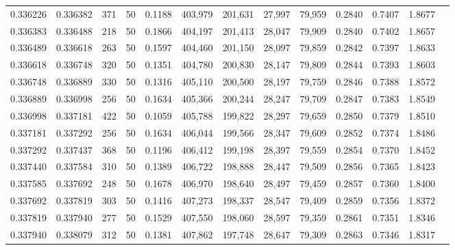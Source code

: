 \begin{tabular}{rrrrrrrrrrrrr}
0.336226 & 0.336382 &   371 &  50 &                                     0.1188 & 403,979 & 201,631 &  27,997 &  79,959 & 0.2840 & 0.7407 & 1.8677 \\
0.336383 & 0.336488 &   218 &  50 &                                     0.1866 & 404,197 & 201,413 &  28,047 &  79,909 & 0.2840 & 0.7402 & 1.8657 \\
0.336489 & 0.336618 &   263 &  50 &                                     0.1597 & 404,460 & 201,150 &  28,097 &  79,859 & 0.2842 & 0.7397 & 1.8633 \\
0.336618 & 0.336748 &   320 &  50 &                                     0.1351 & 404,780 & 200,830 &  28,147 &  79,809 & 0.2844 & 0.7393 & 1.8603 \\
0.336748 & 0.336889 &   330 &  50 &                                     0.1316 & 405,110 & 200,500 &  28,197 &  79,759 & 0.2846 & 0.7388 & 1.8572 \\
0.336889 & 0.336998 &   256 &  50 &                                     0.1634 & 405,366 & 200,244 &  28,247 &  79,709 & 0.2847 & 0.7383 & 1.8549 \\
0.336998 & 0.337181 &   422 &  50 &                                     0.1059 & 405,788 & 199,822 &  28,297 &  79,659 & 0.2850 & 0.7379 & 1.8510 \\
0.337181 & 0.337292 &   256 &  50 &                                     0.1634 & 406,044 & 199,566 &  28,347 &  79,609 & 0.2852 & 0.7374 & 1.8486 \\
0.337292 & 0.337437 &   368 &  50 &                                     0.1196 & 406,412 & 199,198 &  28,397 &  79,559 & 0.2854 & 0.7370 & 1.8452 \\
0.337440 & 0.337584 &   310 &  50 &                                     0.1389 & 406,722 & 198,888 &  28,447 &  79,509 & 0.2856 & 0.7365 & 1.8423 \\
0.337585 & 0.337692 &   248 &  50 &                                     0.1678 & 406,970 & 198,640 &  28,497 &  79,459 & 0.2857 & 0.7360 & 1.8400 \\
0.337692 & 0.337819 &   303 &  50 &                                     0.1416 & 407,273 & 198,337 &  28,547 &  79,409 & 0.2859 & 0.7356 & 1.8372 \\
0.337819 & 0.337940 &   277 &  50 &                                     0.1529 & 407,550 & 198,060 &  28,597 &  79,359 & 0.2861 & 0.7351 & 1.8346 \\
0.337940 & 0.338079 &   312 &  50 &                                     0.1381 & 407,862 & 197,748 &  28,647 &  79,309 & 0.2863 & 0.7346 & 1.8317 \\

\end{tabular}
